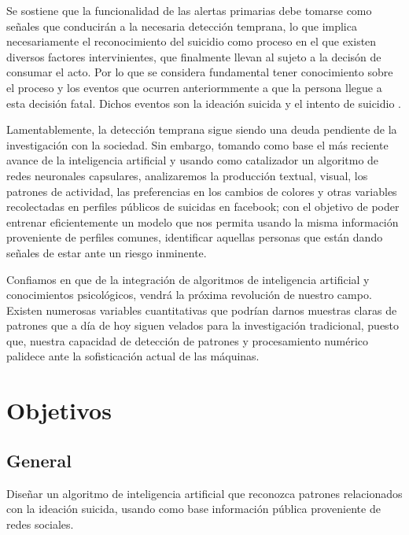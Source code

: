 \documentclass[12pt, man, donotrepeattitle, letterpaper]{apa6}
\begin{document}
    Se sostiene que la funcionalidad de las alertas primarias debe tomarse como señales que conducirán a la necesaria detección temprana, lo que implica necesariamente el reconocimiento del suicidio como proceso en el que existen diversos factores intervinientes, que finalmente llevan al sujeto a la decisón de consumar el acto. Por lo que se considera fundamental tener conocimiento sobre el proceso y los eventos que ocurren anteriormmente a que la persona llegue a esta decisión fatal. Dichos eventos son la ideación suicida y el intento de suicidio \parencite{SANCHEZ2010}.
    
    Lamentablemente, la detección temprana sigue siendo una deuda pendiente de la investigación con la sociedad. Sin embargo, tomando como base el más reciente avance de la inteligencia artificial y usando como catalizador un algoritmo de redes neuronales capsulares, analizaremos la producción textual, visual, los patrones de actividad, las preferencias en los cambios de colores y otras variables recolectadas en perfiles públicos de suicidas en facebook; con el objetivo de poder entrenar eficientemente un modelo que nos permita usando la misma información proveniente de perfiles comunes, identificar aquellas personas que están dando señales de estar ante un riesgo inminente.
    
    Confiamos en que de la integración de algoritmos de inteligencia artificial y conocimientos psicológicos, vendrá la próxima revolución de nuestro campo. Existen numerosas variables cuantitativas que podrían darnos muestras claras de patrones que a día de hoy siguen velados para la investigación tradicional, puesto que, nuestra capacidad de detección de patrones y procesamiento numérico palidece ante la sofisticación actual de las máquinas.
    \newpage
    
    \section{Objetivos}
    \subsection{General}
    Diseñar un algoritmo de inteligencia artificial que reconozca patrones relacionados con la ideación suicida, usando como base información pública proveniente de redes sociales.
    
\end{document}
